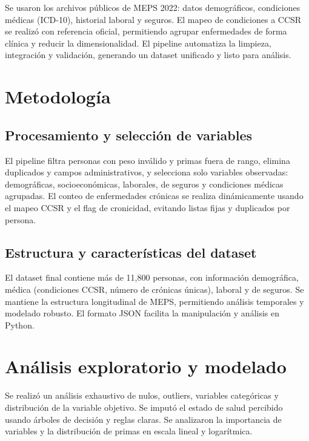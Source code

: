 \documentclass[12pt,a4paper]{article}
\begin{document}
Se usaron los archivos públicos de MEPS 2022: datos demográficos, condiciones médicas (ICD-10), historial laboral y seguros. El mapeo de condiciones a CCSR se realizó con referencia oficial, permitiendo agrupar enfermedades de forma clínica y reducir la dimensionalidad. El pipeline automatiza la limpieza, integración y validación, generando un dataset unificado y listo para análisis.

\section{Metodología}

\subsection{Procesamiento y selección de variables}

El pipeline filtra personas con peso inválido y primas fuera de rango, elimina duplicados y campos administrativos, y selecciona solo variables observadas: demográficas, socioeconómicas, laborales, de seguros y condiciones médicas agrupadas. El conteo de enfermedades crónicas se realiza dinámicamente usando el mapeo CCSR y el flag de cronicidad, evitando listas fijas y duplicados por persona.

\subsection{Estructura y características del dataset}

El dataset final contiene más de 11,800 personas, con información demográfica, médica (condiciones CCSR, número de crónicas únicas), laboral y de seguros. Se mantiene la estructura longitudinal de MEPS, permitiendo análisis temporales y modelado robusto. El formato JSON facilita la manipulación y análisis en Python.


\section{Análisis exploratorio y modelado}

Se realizó un análisis exhaustivo de nulos, outliers, variables categóricas y distribución de la variable objetivo. Se imputó el estado de salud percibido usando árboles de decisión y reglas claras. Se analizaron la importancia de variables y la distribución de primas en escala lineal y logarítmica.
\end{document}
